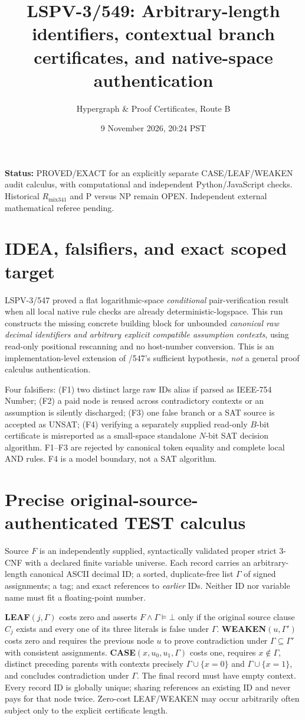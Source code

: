 \documentclass[11pt]{article}
\title{LSPV-3/549: Arbitrary-length identifiers, contextual branch certificates, and native-space authentication}
\author{Hypergraph \& Proof Certificates, Route B}
\date{9 November 2026, 20:24 PST}
\begin{document}
\maketitle
\noindent\textbf{Status:} PROVED/EXACT for an explicitly separate CASE/LEAF/WEAKEN audit calculus, with computational and independent Python/JavaScript checks. Historical $R_{\mathrm{mix341}}$ and P versus NP remain OPEN. Independent external mathematical referee pending.

\section{IDEA, falsifiers, and exact scoped target}
LSPV-3/547 proved a flat logarithmic-space \emph{conditional} pair-verification result when all local native rule checks are already deterministic-logspace. This run constructs the missing concrete building block for unbounded \emph{canonical raw decimal identifiers and arbitrary explicit compatible assumption contexts}, using read-only positional rescanning and no host-number conversion. This is an implementation-level extension of /547's sufficient hypothesis, \emph{not} a general proof calculus authentication.

Four falsifiers: (F1) two distinct large raw IDs alias if parsed as IEEE-754 Number; (F2) a paid node is reused across contradictory contexts or an assumption is silently discharged; (F3) one false branch or a SAT source is accepted as UNSAT; (F4) verifying a separately supplied read-only $B$-bit certificate is misreported as a small-space standalone $N$-bit SAT decision algorithm. F1--F3 are rejected by canonical token equality and complete local AND rules. F4 is a model boundary, not a SAT algorithm.

\section{Precise original-source-authenticated TEST calculus}
Source $F$ is an independently supplied, syntactically validated proper strict 3-CNF with a declared finite variable universe. Each record carries an arbitrary-length canonical ASCII decimal ID; a sorted, duplicate-free list $\Gamma$ of signed assignments; a tag; and exact references to \emph{earlier} IDs. Neither ID nor variable name must fit a floating-point number.

\textbf{LEAF$(j,\Gamma)$} costs zero and asserts $F\wedge\Gamma\models\bot$ only if the original source clause $C_j$ exists and every one of its three literals is false under $\Gamma$. \textbf{WEAKEN$(u,\Gamma')$} costs zero and requires the previous node $u$ to prove contradiction under $\Gamma\subseteq\Gamma'$ with consistent assignments. \textbf{CASE$(x,u_0,u_1,\Gamma)$} costs one, requires $x\notin\Gamma$, distinct preceding parents with contexts precisely $\Gamma\cup\{x=0\}$ and $\Gamma\cup\{x=1\}$, and concludes contradiction under $\Gamma$. The final record must have empty context. Every record ID is globally unique; sharing references an existing ID and never pays for that node twice. Zero-cost LEAF/WEAKEN may occur arbitrarily often subject only to the explicit certificate length.
\end{document}
